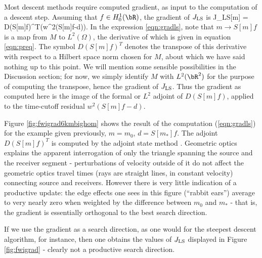 Most descent methods require computed gradient, as input to the
computation of a descent step. Assuming that $f \in H^1_0(\bR)$, the gradient of $J_{\rm LS}$ is 
\be\label{eqn:gradls}
\nabla J_{\rm LS}[m] = D(S[m]f)^T(w^2(S[m]f-d)).
\ee
In the expression \ref{eqn:gradls}, note that $m \rightarrow S[m]f$ is
a map from $M$ to $L^2(\Omega)$, the derivative of which is given in
equation  \ref{eqn:preq}. The symbol $D(S[m]f)^T$ denotes the
transpose of this derivative with respect to a Hilbert space norm
chosen for $M$, about which we have said nothing up to this point. We
will mention some sensible possibilities in the Discussion section;
for now, we simply identify $M$ with $L^2(\bR^2)$ for the purpose of
computing the transpose, hence the gradient of $J_{\rm LS}$. Thus the
gradient as computed here is the image of the formal or $L^2$ adjoint
of $D(S[m]f)$, applied
to the time-cutoff residual $w^2(S[m]f-d)$. 

Figure \ref{fig:fwigrad6kmbighom} shows the result of the computation
(\ref{eqn:gradls}) for the example given previously, $m=m_0$, $d=S[m_*]f$. The adjoint $D(S[m]f)^T$ is
computed by the adjoint state method
\cite[]{Chavent:74,GauTarVir:86,Plessix:06}. Geometric optics explains
the apparent interrogation of only the triangle spanning the source
and the receiver segment - perturbations of velocity outside of it do
not affect the geometric optics travel times (rays are straight lines,
in constant velocity) connecting source and receivers. However there
is very little indication of a productive update: the edge effects one
sees in this figure (``rabbit ears'') average to very nearly zero when
weighted by the difference between $m_0$ and $m_*$ - that is, the
gradient is essentially orthogonal to the best search direction.

If we use the gradient as a search direction, as one would for the
steepest descent algorithm, for instance, then one obtains the values
of $J_{\rm LS}$ displayed in Figure \ref{fig:fwigrad} - clearly not a
productive search direction.

